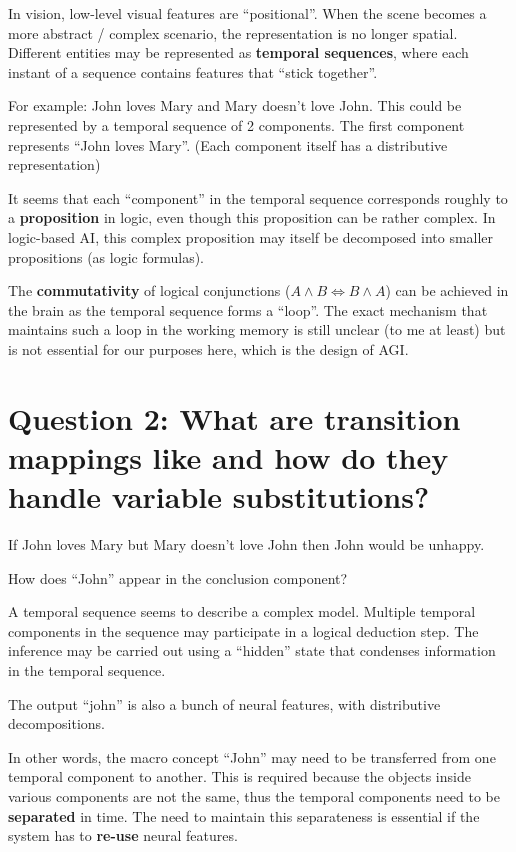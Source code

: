In vision, low-level visual features are ``positional''.  When the scene becomes a more abstract / complex scenario, the representation is no longer spatial.  Different entities may be represented as \textbf{temporal sequences}, where each instant of a sequence contains features that ``stick together''.

For example:  John loves Mary and Mary doesn't love John.  This could be represented by a temporal sequence of 2 components.  The first component represents ``John loves Mary''.  (Each component itself has a distributive representation)

It seems that each ``component'' in the temporal sequence corresponds roughly to a \textbf{proposition} in logic, even though this proposition can be rather complex.  In logic-based AI, this complex proposition may itself be decomposed into smaller propositions (as logic formulas).

The \textbf{commutativity} of logical conjunctions ($A \wedge B \Leftrightarrow B \wedge A$) can be achieved in the brain as the temporal sequence forms a ``loop''.  The exact mechanism that maintains such a loop in the working memory is still unclear (to me at least) but is not essential for our purposes here, which is the design of AGI.

\section{Question 2: What are transition mappings like and how do they handle variable substitutions?}

If John loves Mary but Mary doesn't love John then John would be unhappy.

How does ``John'' appear in the conclusion component?

A temporal sequence seems to describe a complex model.  Multiple temporal components in the sequence may participate in a logical deduction step.  The inference may be carried out using a ``hidden'' state that condenses information in the temporal sequence.

The output ``john'' is also a bunch of neural features, with distributive decompositions.

In other words, the macro concept ``John'' may need to be transferred from one temporal component to another.  This is required because the objects inside various components are not the same, thus the temporal  components need to be \textbf{separated} in time.  The need to maintain this separateness is essential if the system has to \textbf{re-use} neural features.

